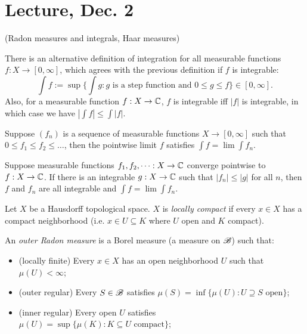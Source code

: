 \documentclass[11pt]{amsart}
\begin{document}
\section{Lecture, Dec. 2}

(Radon measures and integrals, Haar measures)

There is an alternative definition of integration for all measurable functions $f:X\to [0, \infty]$, which agrees with the previous definition if $f$ is integrable:
\[\textstyle \int f := \sup \{\int g: g  \text{ is a step function and } 0\le g\le f\} \in [0,\infty].\]
Also, for a measurable function $f:X\to \mathbb{C}$, $f$ is integrable iff $|f|$ is integrable, in which case we have $|\int f| \le \int |f|$.

\begin{thm}
    Suppose $(f_n)$ is a sequence of measurable functions $X\to [0,\infty]$ such that $0\le f_1\le f_2\le\dots$, then the pointwise limit $f$ satisfies $\int f = \lim \int f_n$.
\end{thm}

\begin{thm}
    Suppose measurable functions $f_1,f_2,\dots : X\to \mathbb{C}$ converge pointwise to $f:X\to \mathbb{C}$. If there is an integrable $g:X\to \mathbb{C}$ such that $|f_n| \le |g|$ for all $n$, then $f$ and $f_n$ are all integrable and $\int f = \lim \int f_n$.
\end{thm}



\begin{defn}
    Let $X$ be a Hausdorff topological space. $X$ is \emph{locally compact} if every $x\in X$ has a compact neighborhood (i.e. $x\in U\subseteq K$ where $U$ open and $K$ compact).
\end{defn}

\begin{defn}
    An \emph{outer Radon measure} is a Borel measure (a measure on $\mathscr{B}$) such that:
    \begin{itemize}
        \item (locally finite) Every $x\in X$ has an open neighborhood $U$ such that $\mu(U)<\infty$;
        \item (outer regular) Every $S\in \mathscr{B}$ satisfies $\mu(S) = \inf \{\mu(U): U\supseteq S \text{ open}\}$;
        \item (inner regular) Every open $U$ satisfies $\mu(U) = \sup \{\mu(K): K\subseteq U \text{ compact}\}$;
    \end{itemize}
\end{defn}
\end{document}
